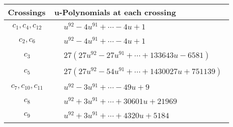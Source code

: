 \documentclass[1p]{elsarticle_modified}
\theoremstyle{definition}
\begin{document}
\begin{tabular}{m{50pt}|m{274pt}}
Crossings & \hspace{64pt}u-Polynomials at each crossing \\
\hline $$\begin{aligned}c_{1},c_{4},c_{12}\end{aligned}$$&$\begin{aligned}
&u^{92}-4 u^{91}+\cdots-4 u+1
\end{aligned}$\\
\hline $$\begin{aligned}c_{2},c_{6}\end{aligned}$$&$\begin{aligned}
&u^{92}-4 u^{91}+\cdots-4 u+1
\end{aligned}$\\
\hline $$\begin{aligned}c_{3}\end{aligned}$$&$\begin{aligned}
&27(27 u^{92}-27 u^{91}+\cdots+133643 u-6581)
\end{aligned}$\\
\hline $$\begin{aligned}c_{5}\end{aligned}$$&$\begin{aligned}
&27(27 u^{92}-54 u^{91}+\cdots+1430027 u+751139)
\end{aligned}$\\
\hline $$\begin{aligned}c_{7},c_{10},c_{11}\end{aligned}$$&$\begin{aligned}
&u^{92}-3 u^{91}+\cdots-49 u+9
\end{aligned}$\\
\hline $$\begin{aligned}c_{8}\end{aligned}$$&$\begin{aligned}
&u^{92}+3 u^{91}+\cdots+30601 u+21969
\end{aligned}$\\
\hline $$\begin{aligned}c_{9}\end{aligned}$$&$\begin{aligned}
&u^{92}+3 u^{91}+\cdots+4320 u+5184
\end{aligned}$\\
\hline
\end{tabular}\\~\\
\end{document}
